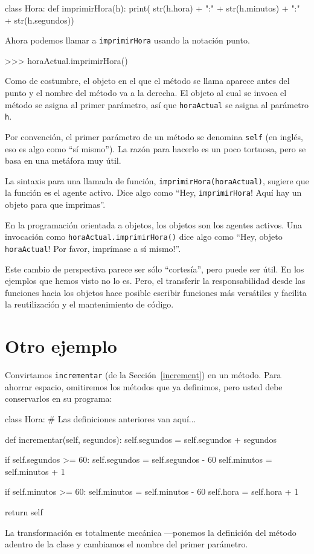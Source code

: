 \begin{pythoncode}
class Hora:
  def imprimirHora(h):
    print( str(h.hora) + ":" + 
          str(h.minutos) + ":" + 
          str(h.segundos))
\end{pythoncode}
 Ahora podemos llamar a \texttt{imprimirHora} usando la notación punto.

\begin{pyconcode}
>>> horaActual.imprimirHora()
\end{pyconcode}

Como de costumbre, el objeto en el que el método se llama aparece
antes del punto y el nombre del método va a la derecha. El objeto
al cual se invoca el método se asigna al primer parámetro, así que
\texttt{horaActual} se asigna al parámetro \texttt{h}.

Por convención, el primer parámetro de un método se denomina \texttt{self}
(en inglés, eso es algo como ``sí mismo''). La razón para hacerlo
es un poco tortuosa, pero se basa en una metáfora muy útil.

La sintaxis para una llamada de función, \texttt{imprimirHora(horaActual)},
sugiere que la función es el agente activo. Dice algo como ``Hey,
\texttt{imprimirHora}! Aquí hay un objeto para que imprimas''.

En la programación orientada a objetos, los objetos son los agentes
activos. Una invocación como \texttt{horaActual.imprimirHora()} dice
algo como ``Hey, objeto \texttt{horaActual}! Por favor, imprímase
a sí mismo!''.

Este cambio de perspectiva parece ser sólo ``cortesía'', pero puede
ser útil. En los ejemplos que hemos visto no lo es. Pero, el transferir
la responsabilidad desde las funciones hacia los objetos hace posible
escribir funciones más versátiles y facilita la reutilización y el
mantenimiento de código.

\section{Otro ejemplo}

Convirtamos \texttt{incrementar} (de la Sección~\ref{increment})
en un método. Para ahorrar espacio, omitiremos los métodos que ya
definimos, pero usted debe conservarlos en su programa:
\begin{pythoncode}
class Hora:
  # Las definiciones anteriores van aquí...
  
  def incrementar(self, segundos):
    self.segundos = self.segundos + segundos

    if self.segundos >= 60:
      self.segundos = self.segundos - 60
      self.minutos = self.minutos + 1

    if self.minutos >= 60:
      self.minutos = self.minutos - 60
      self.hora = self.hora + 1

    return self
\end{pythoncode}
 La transformación es totalmente mecánica —ponemos la definición del
método adentro de la clase y cambiamos el nombre del primer parámetro.

